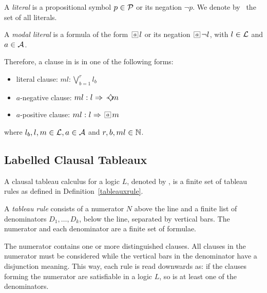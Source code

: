 \begin{definition}
    A \emph{literal} is a propositional symbol $p \in \Prop$ or its negation
    $\neg p$. We denote by \Literals~the set of all literals. 
\end{definition}

\begin{definition}
    A \emph{modal literal} is a formula of the form $\nec{a} l$ or its negation
    $\nec{a} \neg l$, with $l \in \Literals$ and $a \in \Agents$.
\end{definition}

Therefore, a clause in  is in one of the following forms:
\begin{itemize}
    \item literal clause:
        $
        ml: \bigvee^r_{b=1} l_b
        $
    \item $a$-negative clause:
        $
        ml: l \then \pos{a}m
        $
    \item $a$-positive clause:
        $
        ml: l \then \nec{a}m
        $
\end{itemize}
where $l_b, l, m \in \Literals, a \in \Agents$ and $r,b,ml \in \Nat$.

\subsection{Labelled Clausal Tableaux}
\label{sec:clausal_tableaux}


A clausal tableau calculus for a logic $L$, denoted by , is a finite set of
tableau rules as defined in Definition~\ref{tableauxrule}.

\begin{definition}
\label{tableauxrule}
    A \emph{tableau rule \trule} consists of a numerator $N$ above the line and
    a finite list of denominators $D_1, \ldots, D_k$, below the line, separated
    by vertical bars. The numerator and each denominator are a finite set of
    formulae.
\end{definition}

The numerator contains one or more distinguished clauses. All clauses in the
numerator must be considered while the vertical bars in the denominator have a
disjunction meaning. This way, each rule is read downwards as: if the clauses
forming the numerator are satisfiable in a logic $L$, so is at least one of the
denominators.

